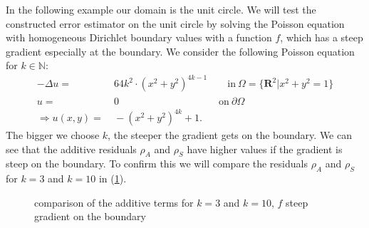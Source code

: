 \documentclass[a4paper, 11pt, twoside]{article}
\begin{document}
In the following example our domain is the unit circle.
We will test the constructed error estimator on the unit circle by solving the Poisson equation with homogeneous Dirichlet boundary values with a function $f$, 
which has a steep gradient especially at the boundary.
We consider the following Poisson equation for $k \in \mathbb{N}$:
 \begin{align}
-\Delta u =&\ 64 k^2 \cdot (x^2+y^2)^{4 k-1} \qquad \text{in}\ \Omega = \{\mathbf{R}^2 | x^2+y^2=1\}\\ \label{exactSolution}
u =&\ 0\qquad\qquad\qquad\qquad\qquad \text{on}\ \partial\Omega\\
\Rightarrow u(x,y) =&\ - (x^2+y^2)^{4k}+1.
\end{align}
The bigger we choose $k$, the steeper the gradient gets on the boundary.
We can see that the additive residuals $\rho_A$ and $\rho_S$ have higher values if the gradient is steep on the boundary.
To confirm this we will compare the residuals $\rho_A$ and $\rho_S$ for $k=3$ and $k=10$ in 
(\ref{k3k10}).\\
\begin{figure}[htbp!]
\centering
{}
    \caption{comparison of the additive terms for $k=3$ and $k=10$, $f$ steep gradient on the boundary}
    \label{k3k10}
    \end{figure}
\end{document}
